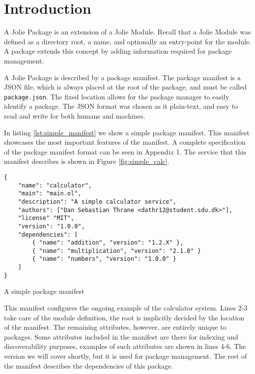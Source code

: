 \section{Introduction}

A Jolie Package is an extension of a Jolie Module. Recall that a Jolie Module
was defined as a directory root, a name, and optionally an entry-point
for the module. A package extends this concept by adding information required
for package management.

A Jolie Package is described by a package manifest. The package manifest is a
JSON file, which is always placed at the root of the package, and must be
called \verb!package.json!. The fixed location allows for the package manager
to easily identify a package. The JSON format was chosen as it plain-text, and
easy to read and write for both humans and machines.

In listing \ref{lst:simple_manifest} we show a simple package manifest. This
manifest showcases the most important features of the manifest. A complete
specification of the package manifest format can be seen in Appendix 1. The
service that this manifest describes is shown in Figure \ref{fig:simple_calc}.

\begin{listing}[H]
\begin{verbatim}
{
    "name": "calculator",
    "main": "main.ol",
    "description": "A simple calculator service",
    "authors": ["Dan Sebastian Thrane <dathr12@student.sdu.dk>"],
    "license" "MIT",
    "version": "1.0.0",
    "dependencies": [
        { "name": "addition", "version": "1.2.X" },
        { "name": "multiplication", "version": "2.1.0" }
        { "name": "numbers", "version": "1.0.0" }
    ]
}
\end{verbatim}
\caption{A simple package manifest}
\label{lst:simple_manifest}
\end{listing}

This manifest configures the ongoing example of the calculator system.  Lines
2-3 take care of the module definition, the root is implicitly decided by the
location of the manifest. The remaining attributes, however, are entirely
unique to packages. Some attributes included in the manifest are there for
indexing and discoverability purposes, examples of such attributes are shown in
lines 4-6. The version we will cover shortly, but it is used for package
management. The rest of the manifest describes the dependencies of this
package.


